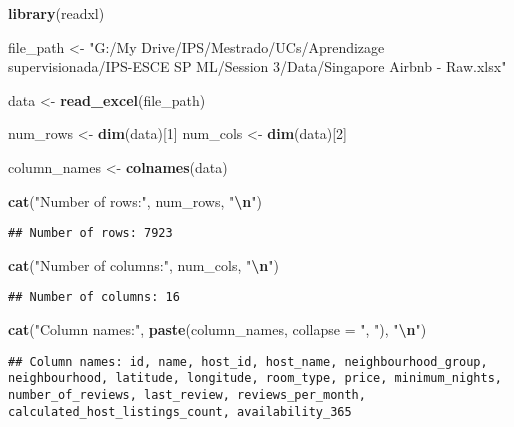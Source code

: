 \documentclass[
]{article}
\newenvironment{Shaded}{\begin{snugshade}}{\end{snugshade}}
\newcommand{\AttributeTok}[1]{\textcolor[rgb]{0.13,0.29,0.53}{#1}}
\newcommand{\DecValTok}[1]{\textcolor[rgb]{0.00,0.00,0.81}{#1}}
\newcommand{\FunctionTok}[1]{\textcolor[rgb]{0.13,0.29,0.53}{\textbf{#1}}}
\newcommand{\NormalTok}[1]{#1}
\newcommand{\OtherTok}[1]{\textcolor[rgb]{0.56,0.35,0.01}{#1}}
\newcommand{\SpecialCharTok}[1]{\textcolor[rgb]{0.81,0.36,0.00}{\textbf{#1}}}
\newcommand{\StringTok}[1]{\textcolor[rgb]{0.31,0.60,0.02}{#1}}
\begin{document}
\begin{Shaded}
\begin{Highlighting}[]
\FunctionTok{library}\NormalTok{(readxl)}

\NormalTok{file\_path }\OtherTok{\textless{}{-}} \StringTok{"G:/My Drive/IPS/Mestrado/UCs/Aprendizage supervisionada/IPS{-}ESCE SP ML/Session 3/Data/Singapore Airbnb {-} Raw.xlsx"}

\NormalTok{data }\OtherTok{\textless{}{-}} \FunctionTok{read\_excel}\NormalTok{(file\_path)}

\NormalTok{num\_rows }\OtherTok{\textless{}{-}} \FunctionTok{dim}\NormalTok{(data)[}\DecValTok{1}\NormalTok{]}
\NormalTok{num\_cols }\OtherTok{\textless{}{-}} \FunctionTok{dim}\NormalTok{(data)[}\DecValTok{2}\NormalTok{]}

\NormalTok{column\_names }\OtherTok{\textless{}{-}} \FunctionTok{colnames}\NormalTok{(data)}

\FunctionTok{cat}\NormalTok{(}\StringTok{"Number of rows:"}\NormalTok{, num\_rows, }\StringTok{"}\SpecialCharTok{\textbackslash{}n}\StringTok{"}\NormalTok{)}
\end{Highlighting}
\end{Shaded}

\begin{verbatim}
## Number of rows: 7923
\end{verbatim}

\begin{Shaded}
\begin{Highlighting}[]
\FunctionTok{cat}\NormalTok{(}\StringTok{"Number of columns:"}\NormalTok{, num\_cols, }\StringTok{"}\SpecialCharTok{\textbackslash{}n}\StringTok{"}\NormalTok{)}
\end{Highlighting}
\end{Shaded}

\begin{verbatim}
## Number of columns: 16
\end{verbatim}

\begin{Shaded}
\begin{Highlighting}[]
\FunctionTok{cat}\NormalTok{(}\StringTok{"Column names:"}\NormalTok{, }\FunctionTok{paste}\NormalTok{(column\_names, }\AttributeTok{collapse =} \StringTok{", "}\NormalTok{), }\StringTok{"}\SpecialCharTok{\textbackslash{}n}\StringTok{"}\NormalTok{)}
\end{Highlighting}
\end{Shaded}

\begin{verbatim}
## Column names: id, name, host_id, host_name, neighbourhood_group, neighbourhood, latitude, longitude, room_type, price, minimum_nights, number_of_reviews, last_review, reviews_per_month, calculated_host_listings_count, availability_365
\end{verbatim}
\end{document}
